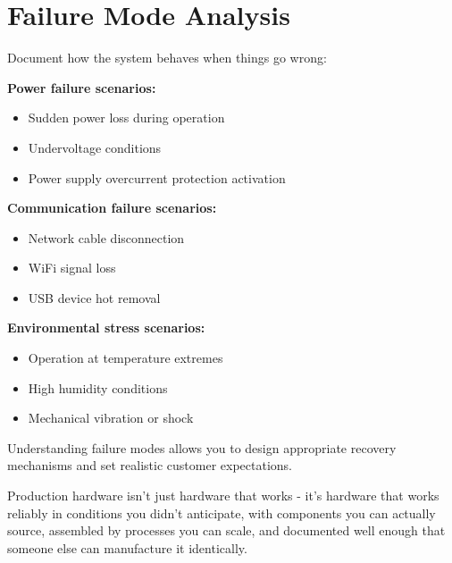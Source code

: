 \section{Failure Mode Analysis}

Document how the system behaves when things go wrong:

\textbf{Power failure scenarios:}
\begin{itemize}
\item Sudden power loss during operation
\item Undervoltage conditions
\item Power supply overcurrent protection activation
\end{itemize}

\textbf{Communication failure scenarios:}
\begin{itemize}
\item Network cable disconnection
\item WiFi signal loss
\item USB device hot removal
\end{itemize}

\textbf{Environmental stress scenarios:}
\begin{itemize}
\item Operation at temperature extremes
\item High humidity conditions
\item Mechanical vibration or shock
\end{itemize}

Understanding failure modes allows you to design appropriate recovery mechanisms and set realistic customer expectations.

Production hardware isn't just hardware that works - it's hardware that works reliably in conditions you didn't anticipate, with components you can actually source, assembled by processes you can scale, and documented well enough that someone else can manufacture it identically.